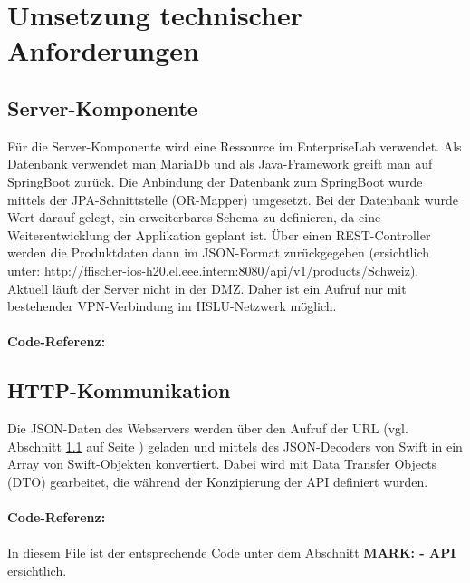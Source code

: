 \documentclass[12pt,titlepage]{article}
\begin{document}
\section{Umsetzung technischer Anforderungen}
\subsection{Server-Komponente} \label{Server-Komponente}
Für die Server-Komponente wird eine Ressource im EnterpriseLab verwendet. Als Datenbank verwendet man MariaDb und als Java-Framework greift man auf SpringBoot zurück. Die Anbindung der Datenbank zum SpringBoot wurde mittels der JPA-Schnittstelle (OR-Mapper) umgesetzt. Bei der Datenbank wurde Wert darauf gelegt, ein erweiterbares Schema zu definieren, da eine Weiterentwicklung der Applikation geplant ist. Über einen REST-Controller werden die Produktdaten dann im JSON-Format zurückgegeben (ersichtlich unter: \url{http://ffischer-ios-h20.el.eee.intern:8080/api/v1/products/Schweiz}). Aktuell läuft der Server nicht in der DMZ. Daher ist ein Aufruf nur mit bestehender VPN-Verbindung im HSLU-Netzwerk möglich.\\
\\
\textbf{Code-Referenz: }

\subsection{HTTP-Kommunikation}
Die JSON-Daten des Webservers werden über den Aufruf der  URL (vgl. Abschnitt \ref{Server-Komponente} auf Seite \pageref{Server-Komponente}) geladen und mittels des JSON-Decoders von Swift in ein Array von Swift-Objekten konvertiert. Dabei wird mit Data Transfer Objects (DTO) gearbeitet, die während der Konzipierung der API definiert wurden.\\
\\
\textbf{Code-Referenz: }\\  \\ In diesem File ist der entsprechende Code unter dem Abschnitt \textbf{\glqq MARK: - API\grqq\,} ersichtlich.
\end{document}
